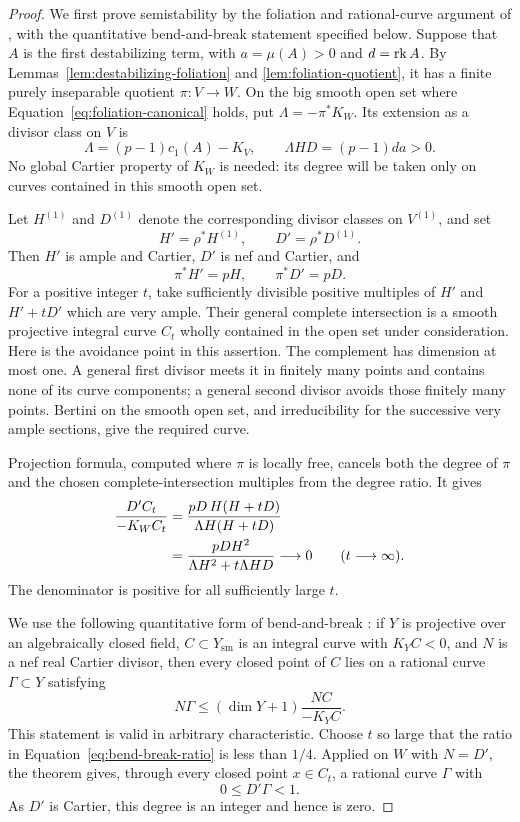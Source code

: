 \begin{proof}
We first prove semistability by the foliation and rational-curve
argument of \cite[Lemma~2.10]{xuzhang2019}, with the quantitative
bend-and-break statement specified below.  Suppose that $A$ is the first
destabilizing term, with $a=\mu(A)>0$ and $d=\operatorname{rk} A$.  By
Lemmas~\ref{lem:destabilizing-foliation} and
\ref{lem:foliation-quotient}, it has a finite purely inseparable quotient
$\pi\colon V\to W$.  On the big smooth open set where
Equation~\eqref{eq:foliation-canonical} holds, put
$\Lambda=-\pi^*K_W$.  Its extension as a divisor class on $V$ is
\[
  \Lambda=(p-1)c_1(A)-K_V,
  \qquad
  \Lambda HD=(p-1)da>0.
\]
No global Cartier property of $K_W$ is needed: its degree will be taken
only on curves contained in this smooth open set.

Let $H^{(1)}$ and $D^{(1)}$ denote the corresponding divisor classes on
$V^{(1)}$, and set
\[
  H'=\rho^*H^{(1)},\qquad D'=\rho^*D^{(1)}.
\]
Then $H'$ is ample and Cartier, $D'$ is nef and Cartier, and
\[
  \pi^*H'=pH,\qquad \pi^*D'=pD.
\]
For a positive integer $t$, take sufficiently divisible positive
multiples of $H'$ and $H'+tD'$ which are very ample.  Their general
complete intersection is a smooth projective integral curve $C_t$ wholly
contained in the open set under consideration.  Here is the avoidance
point in this assertion.  The complement has dimension at most one.  A
general first divisor meets it in finitely many points and contains none
of its curve components; a general second divisor avoids those finitely
many points.  Bertini on the smooth open set, and irreducibility for the
successive very ample sections, give the required curve.

Projection formula, computed where $\pi$ is locally free, cancels both
the degree of $\pi$ and the chosen complete-intersection multiples from
the degree ratio.  It gives
\begin{align}
  \frac{D'C_t}{-K_WC_t}
  &=\frac{pD\,H(H+tD)}{\Lambda H(H+tD)} \notag\\
  &=\frac{pDH^2}{\Lambda H^2+t\Lambda HD}
    \longrightarrow0
    \qquad(t\longrightarrow\infty).
  \label{eq:bend-break-ratio}
\end{align}
The denominator is positive for all sufficiently large $t$.

We use the following quantitative form of bend-and-break
\cite[Theorem~1.1]{jlr2026}: if $Y$ is projective over an algebraically
closed field, $C\subset Y_{\mathrm{sm}}$ is an integral curve with
$K_YC<0$, and $N$ is a nef real Cartier divisor, then every closed point
of $C$ lies on a rational curve $\Gamma\subset Y$ satisfying
\[
  N\Gamma\le(\dim Y+1)\frac{NC}{-K_YC}.
\]
This statement is valid in arbitrary characteristic.  Choose $t$ so large
that the ratio in Equation~\eqref{eq:bend-break-ratio} is less than $1/4$.
Applied on $W$ with $N=D'$, the theorem gives, through every closed point
$x\in C_t$, a rational curve $\Gamma$ with
\[
  0\le D'\Gamma<1.
\]
As $D'$ is Cartier, this degree is an integer and hence is zero.


\end{proof}
